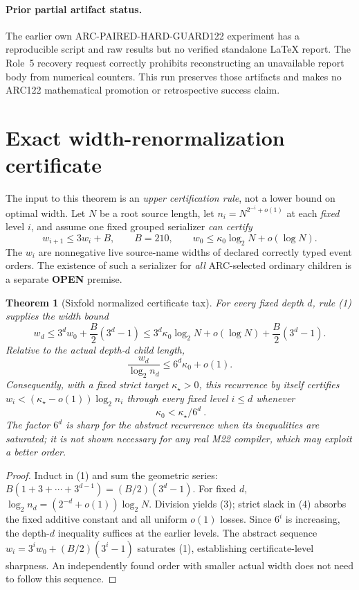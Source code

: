 \documentclass[11pt]{article}
\newtheorem{theorem}{Theorem}
\newcommand{\OPEN}{\textbf{OPEN}}
\begin{document}
\paragraph{Prior partial artifact status.}
The earlier own ARC-PAIRED-HARD-GUARD122 experiment has a
reproducible script and raw results but no verified standalone
LaTeX report.  The Role~5 recovery request correctly prohibits
reconstructing an unavailable report body from numerical
counters.  This run preserves those artifacts and makes no
ARC122 mathematical promotion or retrospective success claim.

\section{Exact width-renormalization certificate}
The input to this theorem is an \emph{upper certification rule}, not
a lower bound on optimal width. Let $N$ be a root source length,
let $n_i=N^{2^{-i}+o(1)}$ at each \emph{fixed} level $i$, and assume
one fixed grouped serializer \emph{can certify}
\[
 w_{i+1}\le3w_i+B,\qquad B=210,\qquad
 w_0\le\kappa_0\log_2N+o(\log N).
 \tag{1}
\]
The $w_i$ are nonnegative live source-name widths of declared
correctly typed event orders.  The existence of such a serializer
for \emph{all} ARC-selected ordinary children is a separate
\OPEN{} premise.

\begin{theorem}[Sixfold normalized certificate tax]\label{th:amplify}
For every fixed depth $d$, rule (1) supplies the width bound
\[
 w_d\le3^dw_0+\frac B2(3^d-1)
 \le 3^d\kappa_0\log_2N+o(\log N)+\frac B2(3^d-1).
 \tag{2}
\]
Relative to the \emph{actual} depth-$d$ child length,
\[
 \frac{w_d}{\log_2n_d}
 \le6^d\kappa_0+o(1).
 \tag{3}
\]
Consequently, with a fixed strict target $\kappa_\star>0$,
this recurrence by itself certifies
$w_i<(\kappa_\star-o(1))\log_2n_i$ through every
fixed level $i\le d$ whenever
\[
 \boxed{\ \kappa_0<\kappa_\star/6^d\ }. \tag{4}
\]
The factor $6^d$ is sharp for the \emph{abstract recurrence}
when its inequalities are saturated; it is not shown necessary
for any real M22 compiler, which may exploit a better order.
\end{theorem}
\begin{proof}
Induct in (1) and sum the geometric series:
$B(1+3+\cdots+3^{d-1})=(B/2)(3^d-1)$.
For fixed $d$, $\log_2n_d=(2^{-d}+o(1))\log_2N$.
Division yields (3); strict slack in (4) absorbs the fixed
additive constant and all uniform $o(1)$ losses.
Since $6^i$ is increasing, the depth-$d$ inequality
suffices at the earlier levels.  The abstract sequence
$w_i=3^iw_0+(B/2)(3^i-1)$ saturates (1),
establishing certificate-level sharpness.
An independently found order with smaller actual width
does not need to follow this sequence.
\end{proof}
\end{document}
